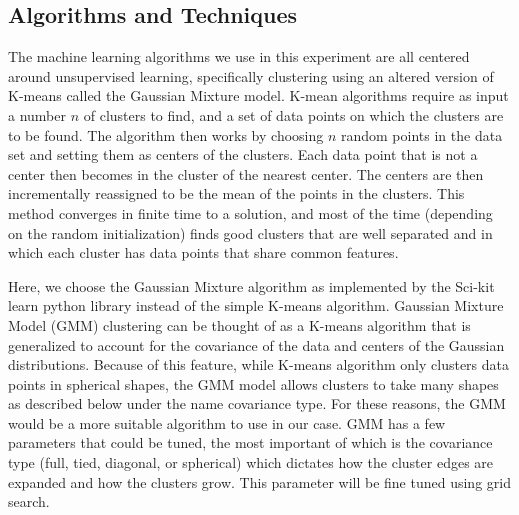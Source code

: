 \documentclass[journal,12pt,onecolumn,draftclsnofoot]{IEEEtran}  %
\begin{document}


\subsection{Algorithms and Techniques}
The machine learning algorithms we use in this experiment are all centered around unsupervised learning, specifically clustering using an altered version of K-means called the Gaussian Mixture model. K-mean algorithms require as input a number $n$ of clusters to find, and a set of data points on which the clusters are to be found. The algorithm then works by choosing $n$ random points in the data set and setting them as centers of the clusters. Each data point that is not a center then becomes in the cluster of the nearest center. The centers are then incrementally reassigned to be the mean of the points in the clusters. This method converges in finite time to a solution, and most of the time (depending on the random initialization) finds good clusters that are well separated and in which each cluster has data points that share common features. 

Here, we choose the Gaussian Mixture algorithm as implemented by the Sci-kit learn python library instead of the simple K-means algorithm. Gaussian Mixture Model (GMM) clustering can be thought of as a K-means algorithm that is generalized to account for the covariance of the data and centers of the Gaussian distributions. Because of this feature, while K-means algorithm only clusters data points in spherical shapes, the GMM model allows clusters to take many shapes as described below under the name covariance type. For these reasons, the GMM would be a more suitable algorithm to use in our case. GMM has a few parameters that could be tuned, the most important of which is the covariance type (full, tied, diagonal, or spherical) which dictates how the cluster edges are expanded and how the clusters grow. This parameter will be fine tuned using grid search. 
\end{document}

